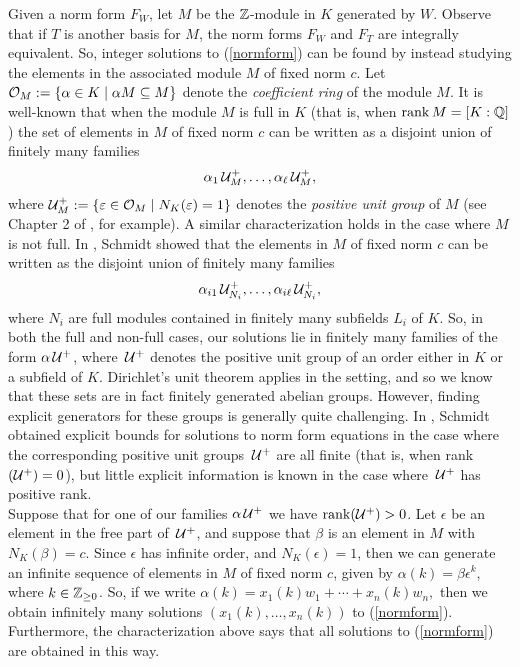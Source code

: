 \documentclass[11pt]{amsart}
\begin{document}
Given a norm form $F_W$, let $M$ be the $\mathbb{Z}$-module in $K$ generated by $W$. Observe that if $T$ is another basis for $M$, the norm forms $F_W$ and $F_T$ are integrally equivalent. So, integer solutions to (\ref{normform}) can be found by instead studying the elements in the associated module $M$ of fixed norm $c$. Let $\mathcal{O}_M:=\{\alpha \in K \mid \alpha M \subseteq M\}$ denote the \textit{coefficient ring} of the module $M$. 
It is well-known that when the module $M$ is full in $K$ (that is, when $\operatorname{rank} M =[K: \mathbb{Q}]$)  the set of elements in $M$ of fixed norm $c$ can be written as a disjoint union of finitely many families
\[\alpha_1\, \mathcal{U}_M^{+}, \dots, \alpha_{\ell}\, \mathcal{U}_M^{+},\]
where $\mathcal{U}_M^+ := \{\varepsilon \in \mathcal{O}_M \mid N_K(\varepsilon)=1\}$
denotes the \textit{positive unit group} of $M$ (see Chapter 2 of \cite{borevich}, for example). A similar characterization holds in the case 
where $M$ is not full. In \cite{schmidt}, Schmidt showed that the elements in $M$ of fixed norm $c$ can be written as the disjoint union of finitely many families
\[\alpha_{i1} \, \mathcal{U}_{N_i}^{+}, \dots, \alpha_{i \ell}\, \mathcal{U}_{N_i}^{+},\]
where $N_i$ are full modules contained in finitely many subfields $L_i$ of $K$. So, in both the full and non-full cases, our solutions lie in finitely many families of the form $\alpha \, \mathcal{U}^+$, where $\,\mathcal{U}^+$ denotes the positive unit group of an order either in $K$ or a subfield of $K$. Dirichlet's unit theorem applies in the setting, and so we know that these sets are in fact finitely generated abelian groups. However, finding explicit generators for these groups is generally quite challenging. In \cite{schmidt2}, Schmidt obtained explicit bounds for solutions to norm form equations in the case where the corresponding positive unit groups  $\,\mathcal{U}^+$ are all finite (that is, when rank$(\mathcal{U}^+)=0$), but little explicit information is known in the case where $\,\mathcal{U}^+$ has positive rank.\\

Suppose that for one of our families $\alpha \, \mathcal{U}^+$ we have $\operatorname{rank}(\mathcal{U}^+)>0$. Let $\epsilon$ be an element in the free part of $\,\mathcal{U}^+$, and suppose that $\beta$ is an element in $M$ with $N_K(\beta)=c$. Since $\epsilon$ has infinite order, and $N_K(\epsilon)=1$, then we can generate an infinite sequence of elements in $M$ of fixed norm $c$, given by $\alpha(k)=\beta\epsilon^k$, where $k \in \mathbb{Z}_{\geq 0}$. So, if we write
$\alpha(k)=x_1(k) w_1+\cdots+x_n(k) w_n,$
then we obtain infinitely many solutions $(x_1(k), \dots, x_n(k))$ to (\ref{normform}). Furthermore, the characterization above says that all solutions to (\ref{normform}) are obtained in this way.\\
\end{document}
